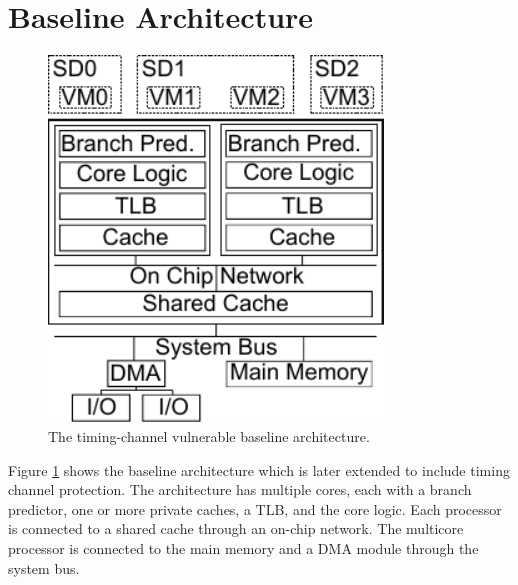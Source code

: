 \section{Baseline Architecture}

    \begin{figure}
        \begin{center}
            \includegraphics[width=3.5in]{figs/baseline.pdf}
            \caption{The timing-channel vulnerable baseline architecture.}
            \label{fig:baseline}
        \end{center}
    \end{figure}

    Figure \ref{fig:baseline} shows the baseline architecture which is later extended to 
    include timing channel protection. The architecture has multiple cores, 
    each with a branch predictor, one or more private caches, a TLB, and the 
    core logic. Each processor is connected to a shared cache through an 
    on-chip network. The multicore processor is connected to the main memory 
    and a DMA module through the system bus. 
